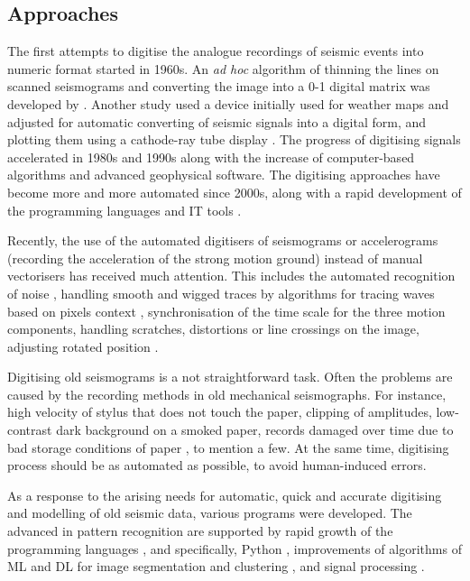 \documentclass[sensors,article,submit,moreauthors,pdftex]{Definitions/mdpi}
\begin{document}
\subsection{Approaches}
The first attempts to digitise the analogue recordings of seismic events into numeric format started in 1960s. An \emph{ad hoc} algorithm of thinning the lines on scanned seismograms and converting the image into a 0-1 digital matrix was developed by \cite{Jarosch1975}. Another study used a device initially used for weather maps and adjusted for automatic converting of seismic signals into a digital form, and plotting them using a cathode-ray tube display \cite{AdamsAllen1961}. The progress of digitising signals accelerated in 1980s \citep{AspinallLatchman,CrouseMatuschka1983} and 1990s \citep{Scherbaum1996a,NorlundGriffiths1993,McGee1995,Harjesetal1993,Scherbaum1996b,Scherbaum1996c} along with the increase of computer-based algorithms and advanced geophysical software. The digitising approaches have become more and more automated since 2000s, along with a rapid development of the programming languages and IT tools \cite{Bietal2016,Ishiietal2015,Schenke,Wangetal2014}. 
 
Recently, the use of the automated digitisers of seismograms or accelerograms (recording the acceleration of the strong motion ground) instead of manual vectorisers has received much attention. This includes the automated recognition of noise \cite{CrouseMatuschka1983}, handling smooth and wigged traces by algorithms for tracing waves based on pixels context \cite{Bietal2016}, synchronisation of the time scale for the three motion components, handling scratches, distortions or line crossings on the image, adjusting rotated position \cite{Trifunacetal1999}. 

Digitising old seismograms is a not straightforward task. Often the problems are caused by the recording methods in old mechanical seismographs. For instance, high velocity of stylus that does not touch the paper, clipping of amplitudes, low-contrast dark background on a smoked paper, records damaged over time due to bad storage conditions of paper \cite{Baskoutasetal2000}, to mention a few. At the same time, digitising process should be as automated as possible, to avoid human-induced errors. 

As a response to the arising needs for automatic, quick and accurate digitising and modelling of old seismic data, various programs were developed. The advanced in pattern recognition are supported by rapid growth of the programming languages \cite{Esmaili,analytica2030006,Lemenkova201991,Lemenkova2019100,Lemenkov202103}, and specifically, Python \cite{Cox,Stoneback, Lemenkova201989}, improvements of algorithms of \ac{ML} and \ac{DL} for image segmentation and clustering \cite{Jenkins,signals1010005,DebeirDecaestecker,signals2030037,Debeir2008}, and signal processing \cite{Foucart,Debeiretal2019}. 
\end{document}
